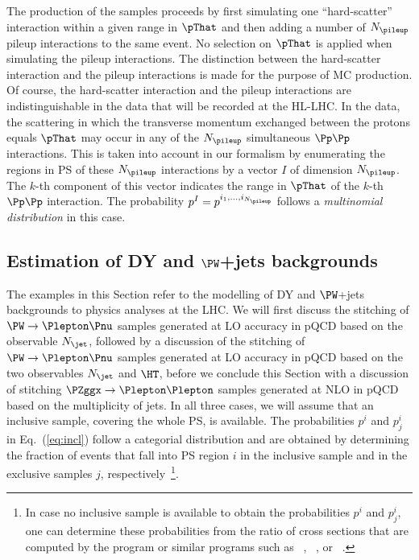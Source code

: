 The production of the samples proceeds by first simulating one ``hard-scatter'' interaction within a given range in $\pThat$
and then adding a number of $N_{\pileup}$ pileup interactions to the same event.
No selection on $\pThat$ is applied when simulating the pileup interactions.
The distinction between the hard-scatter interaction and the pileup interactions is made for the purpose of MC production.
Of course, the hard-scatter interaction and the pileup interactions are indistinguishable in the data that will be recorded at the HL-LHC.
In the data, the scattering in which the transverse momentum exchanged between the protons equals $\pThat$ may occur in any of the $N_{\pileup}$ simultaneous $\Pp\Pp$ interactions.
This is taken into account in our formalism by enumerating the regions in PS of these $N_{\pileup}$ interactions by a vector $I$ of dimension $N_{\pileup}$.
The $k$-th component of this vector indicates the range in $\pThat$ of the $k$-th $\Pp\Pp$ interaction.
The probability $p^{I} = p^{i_{1},\dots,i_{N_{\pileup}}}$ follows a {\em multinomial distribution} in this case.


\subsection{Estimation of DY and $\PW$+jets backgrounds}
\label{sec:examples_background_yield}

The examples in this Section refer to the modelling of DY and $\PW$+jets backgrounds to physics analyses at the LHC.
We will first discuss the stitching of $\PW \to \Plepton\Pnu$ samples generated at LO accuracy in pQCD based on the observable $N_{\jet}$, 
followed by a discussion of the stitching of $\PW \to \Plepton\Pnu$ samples generated at LO accuracy in pQCD based on the two observables $N_{\jet}$ and $\HT$,
before we conclude this Section with a discussion of stitching $\PZggx \to \Plepton\Plepton$ samples generated at NLO in pQCD based on the multiplicity of jets.
In all three cases, we will assume that an inclusive sample, covering the whole PS, is available.
The probabilities $p^{i}$ and $p_{j}^{i}$ in Eq.~(\ref{eq:incl})
follow a categorial distribution and
are obtained by determining the fraction of events that fall into PS region $i$ in the inclusive sample and in the exclusive samples $j$, respectively~\footnote{
  In case no inclusive sample is available to obtain the probabilities $p^{i}$ and $p_{j}^{i}$,
  one can determine these probabilities from the ratio of cross sections that are computed by the program \MGvATNLO 
  or similar programs such as \POWHEG~\cite{Nason:2004rx,Frixione:2007vw,Alioli:2010xd}, \SHERPA~\cite{Gleisberg:2008ta}, or \ALPGEN~\cite{Mangano:2002ea}.}.

